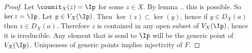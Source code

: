 \begin{proof}
Let $\counit_X(z)=\Ip$ for some $z\in X$. By lemma .. this is possible.
So $\ker{z} = \Ip$.
Let $y\in V_X(\Ip)$. Then $\ker(z)\subset \ker(y)$, hence if $y\in D_X(a)$ then $z\in D_X(a)$.
Therefore $z$ is contained in any open subset of $V_X(\Ip)$, hence it is irreducible.
Any element that is send to $\Ip$ will be the generic point of $V_X(\Ip)$.
Uniqueness of generic points implies injectivity of $F$.

\begin{comment}
Let $U \cup V = V_X(\Ip)$ with $U,V$ closed. 
The inclusions $u,v$ of closed sets $U,V$ is a quasi-compact map, because a closed set of a quasi-compact is quasi-compact. 
Therefore $u_*,v_*$ sends quasi-coherent modules to quasi-coherent modules [Reference].

Let $\sheaf{I},\sheaf{J}$ be the ideal sheaves corresponding to the reduced induced subscheme structure $(U,\sheaf{O}_U),(V,\sheaf{O}_V)$
on the closed sets $U$ and $V$. Hence the sequences
\[\sheaf{I}\rightarrow \sheaf{O}_X \rightarrow u_*(\sheaf{O}_U)\rightarrow 0,\]
\[\sheaf{J}\rightarrow \sheaf{O}_X \rightarrow v_*(\sheaf{O}_V)\rightarrow 0\]
are exact and so $\sheaf{I},\sheaf{J}$ are quasi-coherent.
Let $I,J$ be the global sections of $\sheaf{I}$ and $\sheaf{J}$.
Because of our adjoint equivalence $\Lambda_X(I)=\sheaf{I}$ and $\Lambda_X(J)=\sheaf{J}$, hence also $U=V_X(I)$ and $V=V_X(J)$.
We now have $V_X(IJ)=V_X(\Ip)$.
Moreover $\Lambda_X(\frac{\sheaf{O}(X)}{I}) \iso \frac{\sheaf{O}}{\sheaf{I}} \iso u_*(\sheaf{O}_U)$ and similar for $J,v,V$.
Since $\sheaf{O}_U$ is a reduced sheaf, $\sheaf{I}(W)$ is radical for every open $W \subset X$.

Now invoke the previous lemma for both inclusions wrt $IJ$ and $\Ip$. 
This yields $I\cap J = \Ip$, hence $I=\Ip$ or $J=\Ip$.
Now one of the closed sets $U,V$ is the whole of $V_X(\Ip)$.
\end{comment}
\end{proof}